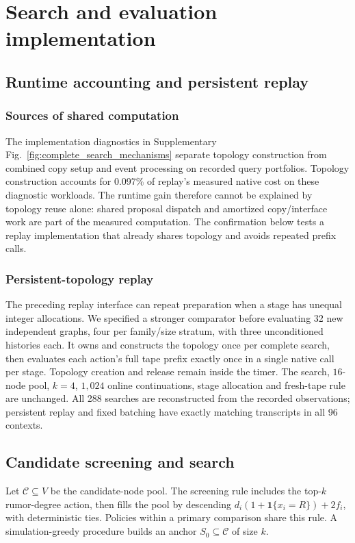 \documentclass[preprint,11pt,sort&compress]{elsarticle}
\newcommand{\ind}{\mathbf{1}}
\begin{document}
\section{Search and evaluation implementation}
\subsection{Runtime accounting and persistent replay}\label{sec:runtime_implementation}
\subsubsection{Sources of shared computation}
The implementation diagnostics in Supplementary Fig.~\ref{fig:complete_search_mechanisms} separate topology construction from combined copy setup and event processing on recorded query portfolios. Topology construction accounts for 0.097\% of replay's measured native cost on these diagnostic workloads. The runtime gain therefore cannot be explained by topology reuse alone: shared proposal dispatch and amortized copy/interface work are part of the measured computation. The confirmation below tests a replay implementation that already shares topology and avoids repeated prefix calls.

\subsubsection{Persistent-topology replay}
The preceding replay interface can repeat preparation when a stage has unequal integer allocations. We specified a stronger comparator before evaluating 32 new independent graphs, four per family/size stratum, with three unconditioned histories each. It owns and constructs the topology once per complete search, then evaluates each action's full tape prefix exactly once in a single native call per stage. Topology creation and release remain inside the timer. The search, $16$-node pool, $k=4$, $1,024$ online continuations, stage allocation and fresh-tape rule are unchanged. All 288 searches are reconstructed from the recorded observations; persistent replay and fixed batching have exactly matching transcripts in all 96 contexts.

\subsection{Candidate screening and search}\label{sec:search_implementation}
Let $\mathcal C\subseteq V$ be the candidate-node pool. The screening rule includes the top-$k$ rumor-degree action, then fills the pool by descending $d_i(1+\ind\{x_i=R\})+2f_i$, with deterministic ties. Policies within a primary comparison share this rule. A simulation-greedy procedure builds an anchor $S_0\subseteq\mathcal C$ of size $k$.
\end{document}
